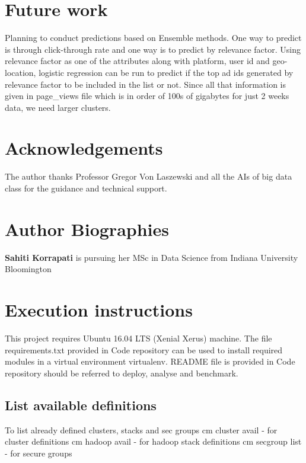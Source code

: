 \documentclass[9pt,twocolumn,twoside]{../../styles/osajnl}
\begin{document}
\section{Future work}

Planning to conduct predictions based on Ensemble methods. One way to predict is through click-through rate and one way is to predict by relevance factor. Using relevance factor as one of the attributes along with platform, user id and geo-location, logistic regression can be run to predict if the top ad ids generated by relevance factor to be included in the list or not. Since all that information is given in page\_views file which is in order of 100s of gigabytes for just 2 weeks data, we need larger clusters. 

\section*{Acknowledgements}
The author thanks Professor Gregor Von Laszewski and all the AIs of big data class for the guidance and technical support.


 
\section*{Author Biographies}
\begingroup
\setlength\intextsep{0pt}
\begin{minipage}[t][3.2cm][t]{1.0\columnwidth} %
  \noindent
  {\bfseries Sahiti Korrapati} is pursuing her MSc in Data Science from
  Indiana University Bloomington
\end{minipage}
\endgroup
\newpage
\appendix
\section{Execution instructions}
This project requires Ubuntu 16.04 LTS (Xenial Xerus) machine. The file requirements.txt provided in Code repository can be used to install required modules in a virtual environment virtualenv. README file is provided in Code repository should be referred to deploy, analyse and benchmark.
\subsection{List available definitions} To list already defined clusters, stacks and sec groups
\newline cm cluster avail - for cluster definitions
\newline cm hadoop avail - for hadoop stack definitions
\newline cm secgroup list - for secure groups
\end{document}
